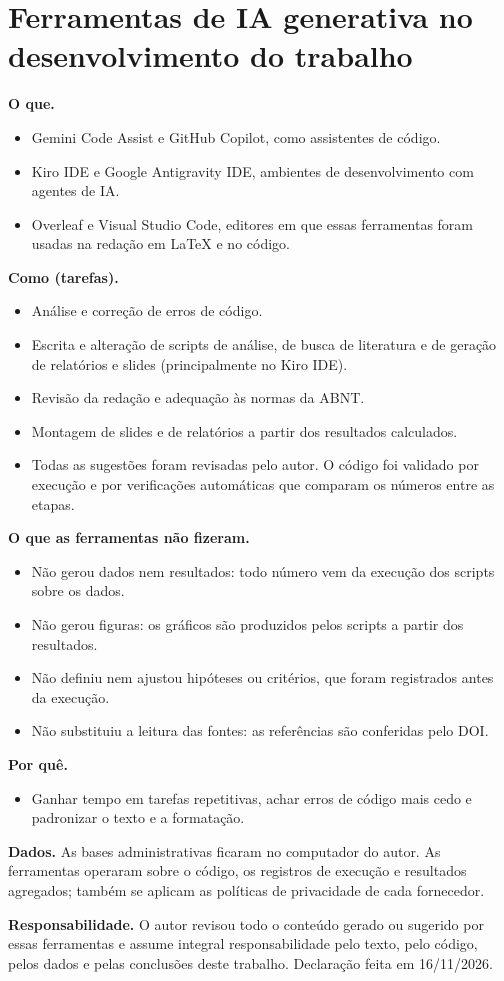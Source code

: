 \section{Ferramentas de IA generativa no desenvolvimento do trabalho}
\textbf{O que.}
\begin{itemize}
  \item Gemini Code Assist e GitHub Copilot, como assistentes de código.
  \item Kiro IDE e Google Antigravity IDE, ambientes de desenvolvimento com agentes de IA.
  \item Overleaf e Visual Studio Code, editores em que essas ferramentas foram usadas na redação em LaTeX e no código.
\end{itemize}
\textbf{Como (tarefas).}
\begin{itemize}
  \item Análise e correção de erros de código.
  \item Escrita e alteração de scripts de análise, de busca de literatura e de geração de relatórios e slides (principalmente no Kiro IDE).
  \item Revisão da redação e adequação às normas da ABNT.
  \item Montagem de slides e de relatórios a partir dos resultados calculados.
  \item Todas as sugestões foram revisadas pelo autor. O código foi validado por execução e por verificações automáticas que comparam os números entre as etapas.
\end{itemize}
\textbf{O que as ferramentas não fizeram.}
\begin{itemize}
  \item Não gerou dados nem resultados: todo número vem da execução dos scripts sobre os dados.
  \item Não gerou figuras: os gráficos são produzidos pelos scripts a partir dos resultados.
  \item Não definiu nem ajustou hipóteses ou critérios, que foram registrados antes da execução.
  \item Não substituiu a leitura das fontes: as referências são conferidas pelo DOI.
\end{itemize}
\textbf{Por quê.}
\begin{itemize}
  \item Ganhar tempo em tarefas repetitivas, achar erros de código mais cedo e padronizar o texto e a formatação.
\end{itemize}

\textbf{Dados.} As bases administrativas ficaram no computador do autor. As ferramentas operaram sobre o código, os registros de execução e resultados agregados; também se aplicam as políticas de privacidade de cada fornecedor.

\textbf{Responsabilidade.} O autor revisou todo o conteúdo gerado ou sugerido por essas ferramentas e assume integral responsabilidade pelo texto, pelo código, pelos dados e pelas conclusões deste trabalho. Declaração feita em 16/11/2026.

